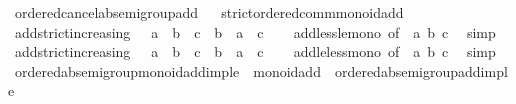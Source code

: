 \begin{isabellebody}
\isanewline
\isanewline
{}\isamarkupfalse%
\ ordered{\isacharunderscore}{\kern0pt}cancel{\isacharunderscore}{\kern0pt}ab{\isacharunderscore}{\kern0pt}semigroup{\isacharunderscore}{\kern0pt}add%
\isadelimproof
\ %
\endisadelimproof
%
\isatagproof
\isacommand{{\isachardot}{\kern0pt}{\isachardot}{\kern0pt}}\isamarkupfalse%
%
\endisatagproof
{\isafoldproof}%
%
\isadelimproof
%
\endisadelimproof
\isanewline
{}\isamarkupfalse%
\ strict{\isacharunderscore}{\kern0pt}ordered{\isacharunderscore}{\kern0pt}comm{\isacharunderscore}{\kern0pt}monoid{\isacharunderscore}{\kern0pt}add%
\isadelimproof
\ %
\endisadelimproof
%
\isatagproof
\isacommand{{\isachardot}{\kern0pt}{\isachardot}{\kern0pt}}\isamarkupfalse%
%
\endisatagproof
{\isafoldproof}%
%
\isadelimproof
%
\endisadelimproof
\isanewline
\isanewline
{}\isamarkupfalse%
\ add{\isacharunderscore}{\kern0pt}strict{\isacharunderscore}{\kern0pt}increasing{\isacharcolon}{\kern0pt}\ {\isachardoublequoteopen}{}\ {\isacharless}{\kern0pt}\ a\ {\isasymLongrightarrow}\ b\ {\isasymle}\ c\ {\isasymLongrightarrow}\ b\ {\isacharless}{\kern0pt}\ a\ {\isacharplus}{\kern0pt}\ c{\isachardoublequoteclose}\isanewline
%
\isadelimproof
\ \ %
\endisadelimproof
%
\isatagproof
{}\isamarkupfalse%
\ add{\isacharunderscore}{\kern0pt}less{\isacharunderscore}{\kern0pt}le{\isacharunderscore}{\kern0pt}mono\ {\isacharbrackleft}{\kern0pt}of\ {}\ a\ b\ c{\isacharbrackright}{\kern0pt}\ \isamarkupfalse%
\ simp%
\endisatagproof
{\isafoldproof}%
%
\isadelimproof
\isanewline
%
\endisadelimproof
\isanewline
{}\isamarkupfalse%
\ add{\isacharunderscore}{\kern0pt}strict{\isacharunderscore}{\kern0pt}increasing{}{\isacharcolon}{\kern0pt}\ {\isachardoublequoteopen}{}\ {\isasymle}\ a\ {\isasymLongrightarrow}\ b\ {\isacharless}{\kern0pt}\ c\ {\isasymLongrightarrow}\ b\ {\isacharless}{\kern0pt}\ a\ {\isacharplus}{\kern0pt}\ c{\isachardoublequoteclose}\isanewline
%
\isadelimproof
\ \ %
\endisadelimproof
%
\isatagproof
{}\isamarkupfalse%
\ add{\isacharunderscore}{\kern0pt}le{\isacharunderscore}{\kern0pt}less{\isacharunderscore}{\kern0pt}mono\ {\isacharbrackleft}{\kern0pt}of\ {}\ a\ b\ c{\isacharbrackright}{\kern0pt}\ \isamarkupfalse%
\ simp%
\endisatagproof
{\isafoldproof}%
%
\isadelimproof
\isanewline
%
\endisadelimproof
\isanewline
{}\isamarkupfalse%
\isanewline
\isanewline
{}\isamarkupfalse%
\ ordered{\isacharunderscore}{\kern0pt}ab{\isacharunderscore}{\kern0pt}semigroup{\isacharunderscore}{\kern0pt}monoid{\isacharunderscore}{\kern0pt}add{\isacharunderscore}{\kern0pt}imp{\isacharunderscore}{\kern0pt}le\ {\isacharequal}{\kern0pt}\ monoid{\isacharunderscore}{\kern0pt}add\ {\isacharplus}{\kern0pt}\ ordered{\isacharunderscore}{\kern0pt}ab{\isacharunderscore}{\kern0pt}semigroup{\isacharunderscore}{\kern0pt}add{\isacharunderscore}{\kern0pt}imp{\isacharunderscore}{\kern0pt}le\isanewline

\end{isabellebody}
